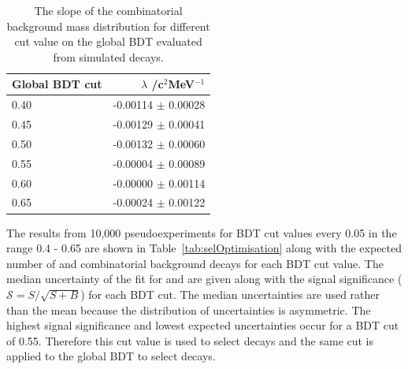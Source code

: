 {\begin{table}[htbp]
\begin{center}
\begin{tabular}{lr}
\toprule \toprule
Global BDT cut & $\lambda$ /c$^{2}$MeV$^{-1}$\\ \midrule
0.40 & -0.00114 $\pm$ 0.00028 \\
0.45 & -0.00129 $\pm$ 0.00041 \\
0.50 & -0.00132 $\pm$ 0.00060 \\
0.55 & -0.00004 $\pm$ 0.00089 \\
0.60 & -0.00000 $\pm$ 0.00114 \\
0.65 & -0.00024 $\pm$ 0.00122 \\ \bottomrule \bottomrule
\end{tabular}
\vspace{0.7cm}
\caption{The slope of the combinatorial background mass distribution for different cut value on the global BDT evaluated from \bbbarmumux simulated decays.}
\label{tab:CBGSlopeBDT}
\end{center}
\vspace{-1.0cm}
\end{table}



The results from 10,000 pseudoexperiments for BDT cut values every 0.05 in the range 0.4 - 0.65 are shown in Table~\ref{tab:selOptimisation} along with the expected number of \bsmumu and combinatorial background decays for each BDT cut value. The median uncertainty of the fit for \tmumu and \invtmumu are given along with the signal significance ($\mathcal{S} = S/\sqrt{S+B}$) for each BDT cut. The median uncertainties are used rather than the mean because the distribution of uncertainties is asymmetric. The highest signal significance and lowest expected uncertainties occur for a BDT cut of 0.55. Therefore this cut value is used to select \bsmumu decays and the same cut is applied to the global BDT to select \bhh decays. 


}
